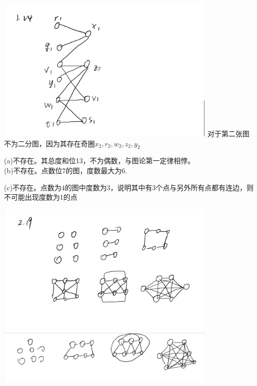 \documentclass[a4paper, justified]{tufte-handout}
\begin{document}
\begin{solution}
	\includegraphics[width = 0.8\textwidth]{1.24.jpg}
	对于第二张图不为二分图，因为其存在奇圈${x_2,r_2,w_2,z_2,y_2}$
\end{solution}

\begin{problem}[CZ 2.1]
\end{problem}

\begin{solution}
	(a)不存在。其总度和位13，不为偶数，与图论第一定律相悖。\\
	(b)不存在。点数位7的图，度数最大为6.

	(c)不存在。点数为4的图中度数为3，说明其中有3个点与另外所有点都有连边，则不可能出现度数为1的点
\end{solution}

\begin{problem}[CZ 2.19]
\end{problem}

\begin{solution}
	\includegraphics[width = 0.8\textwidth]{2.19.jpg}
\end{solution}
\end{document}
